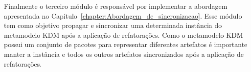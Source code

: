 Finalmente o terceiro módulo é responsável por implementar a abordagem apresentada no Capítulo~\ref{chapter:Abordagem_de_sincronizacao}. Esse módulo tem como objetivo propagar e sincronizar uma determinada instância do metamodelo KDM após a aplicação de refatorações. Como o metamodelo KDM possui um conjunto de pacotes para representar diferentes artefatos é importante manter a instância e todos os outros artefatos sincronizados após a aplicação de refatorações.